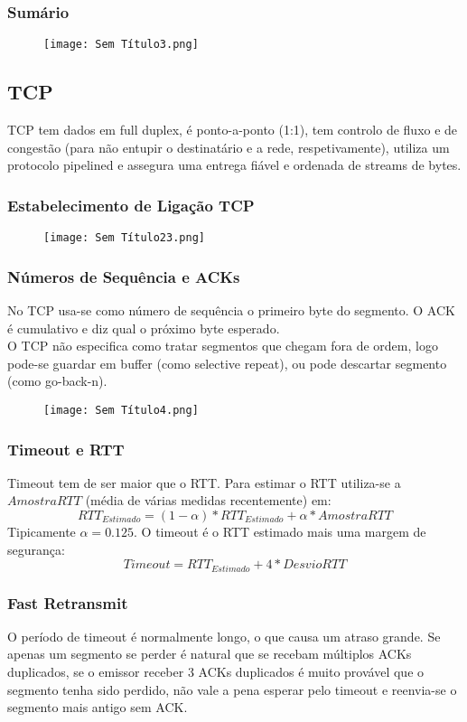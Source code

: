 \documentclass[10pt,a4paper]{report}
\begin{document}
\subsubsection{Sumário}
\begin{figure}[h]
\centering
\texttt{[image: Sem Título3.png]}
\end{figure}
\subsection{TCP}
TCP tem dados em full duplex, é ponto-a-ponto (1:1), tem controlo de fluxo e de congestão (para não entupir o destinatário e a rede, respetivamente), utiliza um protocolo pipelined e assegura uma entrega fiável e ordenada de streams de bytes.
\subsubsection{Estabelecimento de Ligação TCP}
\begin{figure}[H]
\centering
\texttt{[image: Sem Título23.png]}
\end{figure}
\subsubsection{Números de Sequência e ACKs}
No TCP usa-se como número de sequência o primeiro byte do segmento. O ACK é cumulativo e diz qual o próximo byte esperado.\\
O TCP não especifica como tratar segmentos que chegam fora de ordem, logo pode-se guardar em buffer (como selective repeat), ou pode descartar segmento (como go-back-n).
\begin{figure}[H]
\centering
\texttt{[image: Sem Título4.png]}
\end{figure}
\subsubsection{Timeout e RTT}
Timeout tem de ser maior que o RTT. Para estimar o RTT utiliza-se a $AmostraRTT$ (média de várias medidas recentemente) em:
$$
RTT_{Estimado} = (1-\alpha)*RTT_{Estimado} + \alpha*AmostraRTT
$$
Tipicamente $\alpha = 0.125$. O timeout é o RTT estimado mais uma margem de segurança:
$$
Timeout = RTT_{Estimado} + 4*DesvioRTT
$$
\subsubsection{Fast Retransmit}
O período de timeout é normalmente longo, o que causa um atraso grande. Se apenas um segmento se perder é natural que se recebam múltiplos ACKs duplicados, se o emissor receber 3 ACKs duplicados é muito provável que o segmento tenha sido perdido, não vale a pena esperar pelo timeout e reenvia-se o segmento mais antigo sem ACK.
\end{document}
